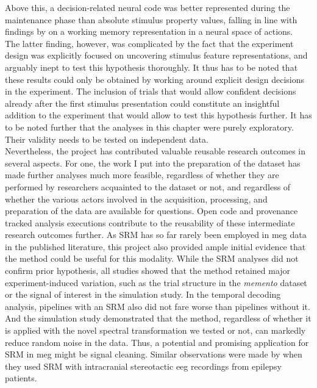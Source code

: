 Above this, a decision-related neural code was better represented during the maintenance phase than absolute stimulus property values, falling in line with findings by \citet{hunt2013trial} on a working memory representation in a neural space of actions.\\
The latter finding, however, was complicated by the fact that the experiment design was explicitly focused on uncovering stimulus feature representations, and arguably inept to test this hypothesis thoroughly.
It thus has to be noted that these results could only be obtained by working around explicit design decisions in the experiment.
The inclusion of trials that would allow confident decisions already after the first stimulus presentation could constitute an insightful addition to the experiment that would allow to test this hypothesis further.
It has to be noted further that the analyses in this chapter were purely exploratory.
Their validity needs to be tested on independent data.\\
Nevertheless, the project has contributed valuable reusable research outcomes in several aspects.
For one, the work I put into the preparation of the dataset has made further analyses much more feasible, regardless of whether they are performed by researchers acquainted to the dataset or not, and regardless of whether the various actors involved in the acquisition, processing, and preparation of the data are available for questions.
Open code and provenance tracked analysis executions contribute to the reusability of these intermediate research outcomes further.
As \gls{SRM} has so far rarely been employed in \gls{meg} data in the published literature, this project also provided ample initial evidence that the method could be useful for this modality.
While the \gls{SRM} analyses did not confirm prior hypothesis, all studies showed that the method retained major experiment-induced variation, such as the trial structure in the \textit{memento} dataset or the signal of interest in the simulation study.
In the temporal decoding analysis, pipelines with an \gls{SRM} also did not fare worse than pipelines without it.
And the simulation study demonstrated that the method, regardless of whether it is applied with the novel spectral transformation we tested or not, can markedly reduce random noise in the data.
Thus, a potential and promising application for \gls{SRM} in \gls{meg} might be signal cleaning.
Similar observations were made by \citet{xie2021minimal} when they used \gls{SRM} with intracranial stereotactic \gls{eeg} recordings from epilepsy patients.
